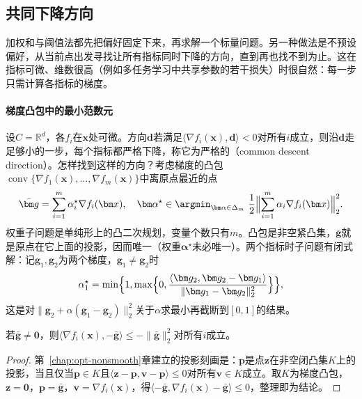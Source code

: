 \subsection{共同下降方向}
\label{sec:opt-mmb-common-descent}

加权和与阈值法都先把偏好固定下来，再求解一个标量问题。另一种做法是不预设偏好，从当前点出发寻找让所有指标同时下降的方向，直到再也找不到为止。这在指标可微、维数很高（例如多任务学习中共享参数的若干损失）时很自然：每一步只需计算各指标的梯度。

\paragraph{梯度凸包中的最小范数元}
设$C=\mathbb R^d$，各$f_i$在$\bm x$处可微。方向$\bm d$若满足$\langle\nabla f_i(\bm x),\bm d\rangle<0$对所有$i$成立，则沿$\bm d$走足够小的一步，每个指标都严格下降，称它为严格的（common descent direction）。怎样找到这样的方向？考虑梯度的凸包$\operatorname{conv}\{\nabla f_1(\bm x),\dots,\nabla f_m(\bm x)\}$中离原点最近的点
\begin{equation}
\label{eq:opt-mmb-min-norm}
\bar{\bm g}=\sum_{i=1}^m\alpha_i^\star\nabla f_i(\bm x),\quad
\bm\alpha^\star\in\argmin_{\bm\alpha\in\Delta_m}\ \frac12\Bigl\lVert\sum_{i=1}^m\alpha_i\nabla f_i(\bm x)\Bigr\rVert_2^2.
\end{equation}
权重子问题是单纯形上的凸二次规划，变量个数只有$m$。凸包是非空紧凸集，$\bar{\bm g}$就是原点在它上面的投影，因而唯一（权重$\bm\alpha^\star$未必唯一）。两个指标时子问题有闭式解：记$\bm g_1,\bm g_2$为两个梯度，$\bm g_1\neq\bm g_2$时
\[
\alpha_1^\star=\min\Bigl\{1,\max\Bigl\{0,\frac{\langle\bm g_2,\bm g_2-\bm g_1\rangle}{\lVert\bm g_1-\bm g_2\rVert_2^2}\Bigr\}\Bigr\},
\]
这是对$\lVert\bm g_2+\alpha(\bm g_1-\bm g_2)\rVert_2^2$关于$\alpha$求最小再截断到$[0,1]$的结果。

\begin{lemma}[最小范数元给出共同下降]
\label{lem:opt-mmb-min-norm-descent}
若$\bar{\bm g}\neq\bm 0$，则$\langle\nabla f_i(\bm x),-\bar{\bm g}\rangle\leq-\lVert\bar{\bm g}\rVert_2^2$对所有$i$成立。
\end{lemma}

\begin{proof}
第~\ref{chap:opt-nonsmooth}章建立的投影刻画是：$\bm p$是点$\bm z$在非空闭凸集$K$上的投影，当且仅当$\bm p\in K$且$\langle\bm z-\bm p,\bm v-\bm p\rangle\leq0$对所有$\bm v\in K$成立。取$K$为梯度凸包，$\bm z=\bm 0$，$\bm p=\bar{\bm g}$，$\bm v=\nabla f_i(\bm x)$，得$\langle-\bar{\bm g},\nabla f_i(\bm x)-\bar{\bm g}\rangle\leq0$，整理即为结论。
\end{proof}

